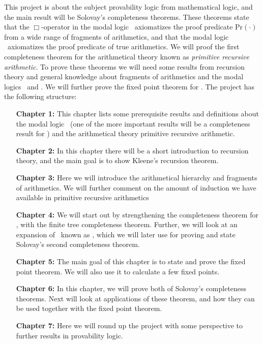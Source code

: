\documentclass[../main.tex]{subfiles}
\begin{document}
This project is about the subject provability logic from mathematical logic,
and the main result will be Solovay's completeness theorems. These theorems
state that the $\Box$-operator in the  modal logic \GL\  axiomatizes the proof
predicate $\text{Pr}(\cdot)$ from a wide range of fragments of arithmetics, and
that the modal logic \GLS\ axiomatizes the proof predicate of true arithmetics.
We will proof the first completeness theorem for the arithmetical theory known
as \textit{primitive recursive arithmetic}.
To prove these theorems we will need some results from recursion theory and
general knowledge about fragments of arithmetics and the modal logics \GL\ and
\GLS. We will further prove the fixed point theorem for \GL.
The project has the following structure: 
\begin{enumerate}
	\item[\textbf{Chapter 1:}] This chapter lists some prerequisite results and
		definitions about the modal logic \GL\ (one of the more
		important results will be a completeness result for \GL)  and the arithmetical
		theory  primitive
		recursive arithmetic. 
	\item[\textbf{Chapter 2:}] In this chapter there will be a short introduction to recursion
		theory, and the main goal is to show Kleene's recursion theorem.
	\item[\textbf{Chapter 3:}] Here we will introduce the arithmetical hierarchy and
		fragments of arithmetics. We will further comment on the amount
		of induction we have available in primitive recursive
		arithmetics
	\item[\textbf{Chapter 4:}] We will start out by strengthening the completeness
		theorem for \GL, with the finite tree completeness theorem.
		Further, we will look at an expansion of \GL\ known as \GLS,
		which we will later use  for proving and state Solovay's second completeness
		theorem.
	\item[\textbf{Chapter 5:}] The main goal of this chapter is to state and prove
		the fixed point theorem. We will also use it to calculate a few fixed
		points.
	\item[\textbf{Chapter 6:}] In this chapter, we will prove both of Solovay's
		completeness theorems. Next will look
		at applications of these theorem, and how they can be used
		together with the fixed point theorem.
	\item[\textbf{Chapter 7:}] Here we will round up the project with some
		perspective to further results in provability logic.
\end{enumerate}
\end{document}
